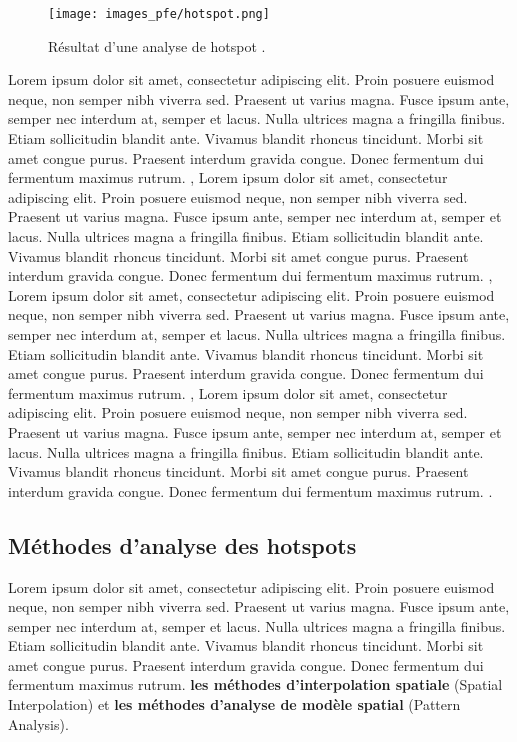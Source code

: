 \medskip

\begin{figure}[hbt!]
  \centering
  \texttt{[image: images\_pfe/hotspot.png]}
  \caption{Résultat d'une analyse de hotspot \parencite{kalinic_kernel_2018}.}
  \label{fig:vue-snoc-pos}
\end{figure}
\FloatBarrier

Lorem ipsum dolor sit amet, consectetur adipiscing elit. Proin posuere euismod neque, non semper nibh viverra sed. Praesent ut varius magna. Fusce ipsum ante, semper nec interdum at, semper et lacus. Nulla ultrices magna a fringilla finibus. Etiam sollicitudin blandit ante. Vivamus blandit rhoncus tincidunt. Morbi sit amet congue purus. Praesent interdum gravida congue. Donec fermentum dui fermentum maximus rutrum. \parencite{hart_kernel_2014,ansari_methods_2014,kalinic_kernel_2018}, Lorem ipsum dolor sit amet, consectetur adipiscing elit. Proin posuere euismod neque, non semper nibh viverra sed. Praesent ut varius magna. Fusce ipsum ante, semper nec interdum at, semper et lacus. Nulla ultrices magna a fringilla finibus. Etiam sollicitudin blandit ante. Vivamus blandit rhoncus tincidunt. Morbi sit amet congue purus. Praesent interdum gravida congue. Donec fermentum dui fermentum maximus rutrum. \parencite{anderson_kernel_2009,montella_comparative_2010,yu_comparative_2014}, Lorem ipsum dolor sit amet, consectetur adipiscing elit. Proin posuere euismod neque, non semper nibh viverra sed. Praesent ut varius magna. Fusce ipsum ante, semper nec interdum at, semper et lacus. Nulla ultrices magna a fringilla finibus. Etiam sollicitudin blandit ante. Vivamus blandit rhoncus tincidunt. Morbi sit amet congue purus. Praesent interdum gravida congue. Donec fermentum dui fermentum maximus rutrum. \parencite{lin_hotspot_2010}, Lorem ipsum dolor sit amet, consectetur adipiscing elit. Proin posuere euismod neque, non semper nibh viverra sed. Praesent ut varius magna. Fusce ipsum ante, semper nec interdum at, semper et lacus. Nulla ultrices magna a fringilla finibus. Etiam sollicitudin blandit ante. Vivamus blandit rhoncus tincidunt. Morbi sit amet congue purus. Praesent interdum gravida congue. Donec fermentum dui fermentum maximus rutrum. \parencite{bagstad_evaluating_2017}.

\subsection{Méthodes d'analyse des hotspots}

Lorem ipsum dolor sit amet, consectetur adipiscing elit. Proin posuere euismod neque, non semper nibh viverra sed. Praesent ut varius magna. Fusce ipsum ante, semper nec interdum at, semper et lacus. Nulla ultrices magna a fringilla finibus. Etiam sollicitudin blandit ante. Vivamus blandit rhoncus tincidunt. Morbi sit amet congue purus. Praesent interdum gravida congue. Donec fermentum dui fermentum maximus rutrum. \textbf{les méthodes d'interpolation spatiale} (Spatial Interpolation) et \textbf{les méthodes d'analyse de modèle spatial} (Pattern Analysis).


